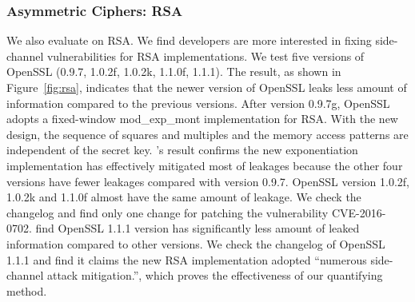 \subsubsection{Asymmetric Ciphers: RSA}\label{eval:asym}
We also evaluate \tool{} on RSA.  We find developers are more interested in 
fixing side-channel vulnerabilities for RSA implementations. 
We test five versions of OpenSSL (0.9.7, 1.0.2f, 1.0.2k, 1.1.0f, 1.1.1). The
result, as shown in Figure~\ref{fig:rsa}, indicates that the newer
version of OpenSSL leaks less amount of information compared to the previous
versions. After version 0.9.7g, OpenSSL adopts a fixed-window \textsf{mod\_exp\_mont}
implementation for RSA\@. With the new design, the sequence of squares and
multiples and the memory access patterns are independent of the secret key.
\tool{}'s result confirms the new exponentiation implementation has 
effectively mitigated most of leakages because the other four versions have fewer
leakages compared with version 0.9.7. 
OpenSSL version 1.0.2f, 1.0.2k and 1.1.0f almost have the
same amount of leakage. We check the changelog and find only one change for
patching the vulnerability CVE-2016-0702. 
\tool{} find OpenSSL 1.1.1 version has significantly less amount of 
leaked information compared to other versions.
We check the changelog of OpenSSL 1.1.1 and find it claims
the new RSA implementation adopted ``numerous side-channel attack mitigation.'', 
which proves the effectiveness of our quantifying method.


